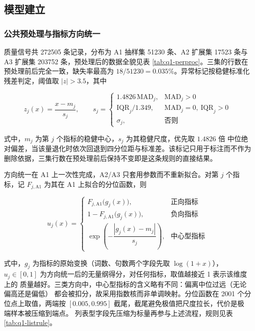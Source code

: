 \documentclass[bwprint]{gmcmthesis}
\numberwithin{equation}{section}
\numberwithin{figure}{section}
\numberwithin{table}{section}
\begin{document}
\subsection{模型建立}

\subsubsection{公共预处理与指标方向统一}

质量信号共 272505 条记录，分布为 A1 抽样集 51230 条、A2 扩展集 17523 条与
A3 扩展集 203752 条，预处理后的数据全貌见表 \ref{tab:q1-perproc}。三集的行数在
预处理前后完全一致，缺失率最高为 $18/51230 = 0.035\%$。异常标记按稳健标准化
残差判定，阈值取 $|z|>3.5$，其中

\begin{equation}
z_j(x)=\frac{x-m_j}{s_j},\qquad
s_j=\begin{cases}1.4826\,\mathrm{MAD}_j, & \mathrm{MAD}_j>0\\[2pt]
\mathrm{IQR}_j/1.349, & \mathrm{MAD}_j=0,\ \mathrm{IQR}_j>0\\[2pt]
\sigma_j, & \text{否则}\end{cases}
\end{equation}

式中，$m_j$ 为第 $j$ 个指标的稳健中心，$s_j$ 为其稳健尺度，优先取 $1.4826$ 倍
中位绝对偏差，当该量退化时依次回退到四分位距与标准差。该标记只用于标注而不作为
删除依据，三集行数在预处理前后保持不变即是这条规则的直接结果。

方向统一在 A1 上一次性完成，A2/A3 只套用参数而不重新拟合。对第 $j$ 个指标，记
$F_{j,\mathrm{A1}}$ 为其在 A1 上拟合的分位函数，则

\begin{equation}
u_j(x)=\begin{cases}
F_{j,\mathrm{A1}}\bigl(g_j(x)\bigr), & \text{正向指标}\\[2pt]
1-F_{j,\mathrm{A1}}\bigl(g_j(x)\bigr), & \text{负向指标}\\[2pt]
\exp\!\left(-\dfrac{|g_j(x)-m_j|}{s_j}\right), & \text{中心型指标}
\end{cases}
\end{equation}

式中，$g_j$ 为指标的原始变换（词数、句数两个字段先取 $\log(1+x)$），
$u_j\in[0,1]$ 为方向统一后的无量纲得分，对任何指标，取值越接近 1 表示该维度上的
质量越好。三类方向中，中心型指标的含义略有不同：偏离中位过远（无论偏高还是偏低）
都会被扣分，故采用指数核而非单调映射。分位函数在 2001 个分位点上取值，两端按
$[0.005,0.995]$ 截尾，截尾避免极值把尺度拉长，代价是极端样本被压缩到端点。
列表型字段先压缩为标量再参与上述流程，规则见表 \ref{tab:q1-listrule}。
\end{document}
